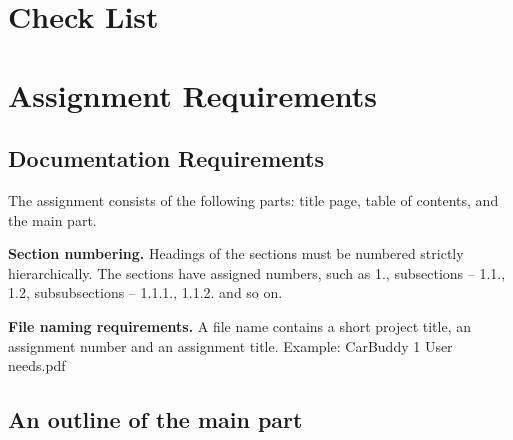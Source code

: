 \documentclass[]{VUMIFTemplateClass}
\begin{document}

\onehalfspacing


\singlespacing
{}


\tableofcontents
\onehalfspacing


\section*{Check List \checkmark}

\section*{Assignment Requirements}

\subsection*{Documentation Requirements}

The assignment consists of the following parts: title page, table of contents,
and the main part.

\textbf{Section numbering.} Headings of the sections must be numbered strictly
hierarchically. The sections have assigned numbers, such as 1., subsections –
1.1., 1.2, subsubsections – 1.1.1., 1.1.2. and so on. \checkmark

\textbf{File naming requirements.} A file name contains a short project title,
an assignment number and an assignment title. Example: CarBuddy 1 User needs.pdf

\subsection*{An outline of the main part}
\end{document}
